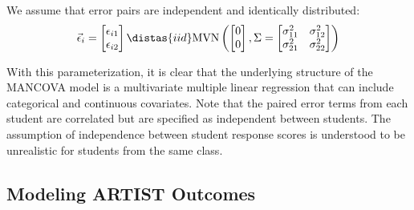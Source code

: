 We assume that error pairs are independent and identically distributed:
\[
\vec{\epsilon}_{i} = 
\begin{bmatrix}
  \epsilon_{i1} \\ \epsilon_{i2} 
 \end{bmatrix}  
 \distas{iid} \text{MVN} \left( 
 \begin{bmatrix}
  0 \\ 0 
 \end{bmatrix},
 \Sigma = \begin{bmatrix}
  \sigma_{11}^2 & \sigma_{12}^2 \\ 
  \sigma_{21}^2 & \sigma_{22}^2
 \end{bmatrix}
 \right)
\]

% 
% 

With this parameterization, it is clear that the underlying structure of the MANCOVA model is a multivariate multiple linear regression that can include categorical and continuous covariates. Note that the paired error terms from each student are correlated but are specified as independent between students. The assumption of independence between student response scores is understood to be unrealistic for students from the same class. 

\subsection{Modeling ARTIST Outcomes}
\label{ArtistModel}

